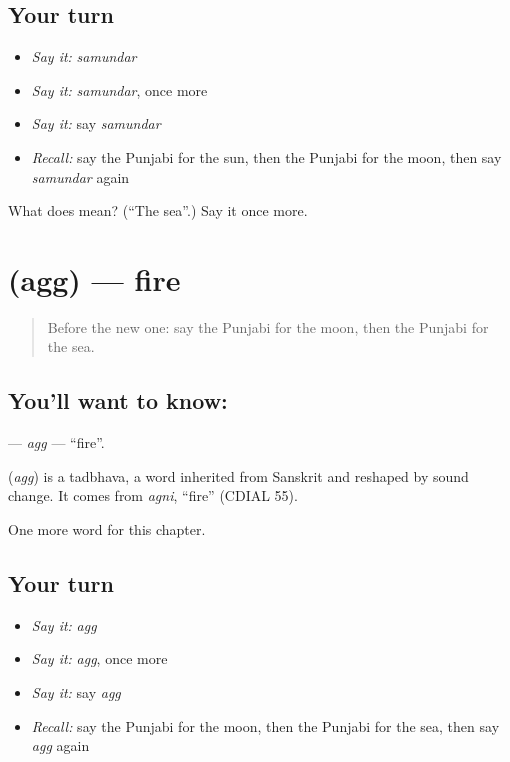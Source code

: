 \subsection*{Your turn}
\begin{itemize}
\raggedright
  \item \emph{Say it:} \emph{samundar}
  \item \emph{Say it:} \emph{samundar}, once more
  \item \emph{Say it:} say \emph{samundar}
  \item \emph{Recall:} say the Punjabi for the sun, then the Punjabi for the moon, then say \emph{samundar} again
\end{itemize}

\begin{tcolorbox}[breakable,colback=teal!4,colframe=teal!35!black,title={Before you move on}]
What does  mean? (\textquotedblleft{}The sea\textquotedblright{}.) Say it once more.
\end{tcolorbox}
\section[\texorpdfstring{\pa{ਅੱਗ} (agg)}{ਅੱਗ (agg)}]{ (agg) — fire}

\label{lesson:PA-C76-agg}



\begin{quote}
Before the new one: say the Punjabi for the moon, then the Punjabi for the sea.
\end{quote}

\subsection*{You'll want to know: }
\textbf{} — \emph{agg} — \textquotedblleft{}fire\textquotedblright{}.

\begin{cousinweb}
\textbf{} (\emph{agg}) is a tadbhava, a word inherited from Sanskrit and reshaped by sound change. It comes from \emph{agni}, \textquotedblleft{}fire\textquotedblright{} (CDIAL 55).
\end{cousinweb}

\begin{grammarlens}[title={What you've built}]
One more word for this chapter.
\end{grammarlens}

\subsection*{Your turn}
\begin{itemize}
\raggedright
  \item \emph{Say it:} \emph{agg}
  \item \emph{Say it:} \emph{agg}, once more
  \item \emph{Say it:} say \emph{agg}
  \item \emph{Recall:} say the Punjabi for the moon, then the Punjabi for the sea, then say \emph{agg} again
\end{itemize}


